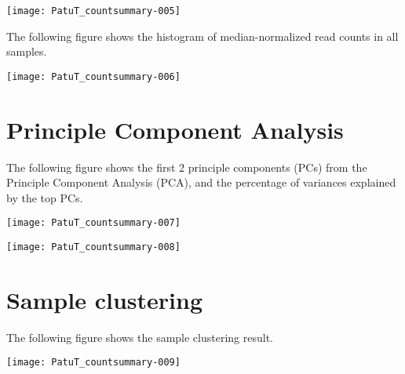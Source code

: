 \documentclass{article}
\begin{document}
\texttt{[image: PatuT\_countsummary-005]}

The following figure shows the histogram of median-normalized read counts in all samples.


\texttt{[image: PatuT\_countsummary-006]}


\newpage\section{Principle Component Analysis}
The following figure shows the first 2 principle components (PCs) from the Principle Component Analysis (PCA), and the percentage of variances explained by the top PCs.



\texttt{[image: PatuT\_countsummary-007]}

\texttt{[image: PatuT\_countsummary-008]}


\newpage\section{Sample clustering}
The following figure shows the sample clustering result.


\texttt{[image: PatuT\_countsummary-009]}

\end{document}
